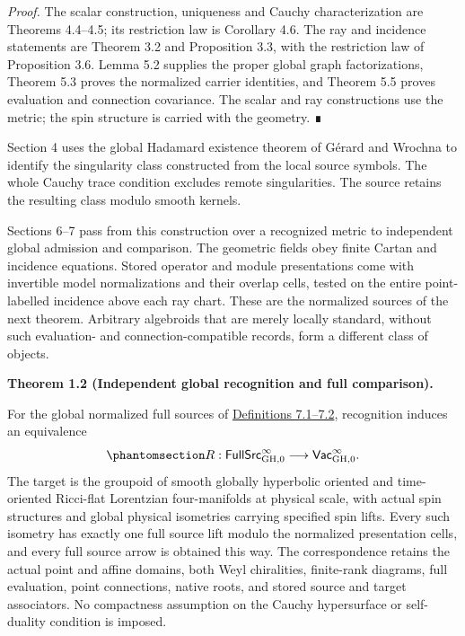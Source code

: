 \documentclass[
  english,
  11pt,
  reqno]{amsart}
\makeatletter
\newcommand{\pandocstatementheading}[1]{%
  \par\addpenalty{\@beginparpenalty}%
  \addvspace{.5\baselineskip plus .2\baselineskip minus .2\baselineskip}%
  {\normalfont\bfseries #1\par}%
  \nobreak\@afterindenttrue\@afterheading
}
\makeatother
\begin{document}
\emph{Proof.} The scalar construction, uniqueness and Cauchy
characterization are Theorems 4.4--4.5; its restriction law is Corollary
4.6. The ray and incidence statements are Theorem 3.2 and Proposition
3.3, with the restriction law of Proposition 3.6. Lemma 5.2 supplies the
proper global graph factorizations, Theorem 5.3 proves the normalized
carrier identities, and Theorem 5.5 proves evaluation and connection
covariance. The scalar and ray constructions use the metric; the spin
structure is carried with the geometry. ∎

Section 4 uses the global Hadamard existence theorem of Gérard and
Wrochna to identify the singularity class constructed from the local
source symbols. The whole Cauchy trace condition excludes remote
singularities. The source retains the resulting class modulo smooth
kernels.

Sections 6--7 pass from this construction over a recognized metric to
independent global admission and comparison. The geometric fields obey
finite Cartan and incidence equations. Stored operator and module
presentations come with invertible model normalizations and their
overlap cells, tested on the entire point-labelled incidence above each
ray chart. These are the normalized sources of the next theorem.
Arbitrary algebroids that are merely locally standard, without such
evaluation- and connection-compatible records, form a different class of
objects.

\pandocstatementheading{\protect{}\label{thm:global-normalized-correspondence-overview}Theorem 1.2 (Independent global recognition and full comparison).}

For the global normalized full sources of
\hyperref[def:global-independent-normalized-wave-packet]{Definitions
7.1--7.2}, recognition induces an equivalence
\begin{equation}\protect\phantomsection\label{eq:global-correspondence-overview}{
R:\mathsf{FullSrc}^{\infty}_{\mathrm{GH},0}
\longrightarrow\mathsf{Vac}^{\infty}_{\mathrm{GH},0}.
}\end{equation} The target is the groupoid of smooth globally hyperbolic
oriented and time-oriented Ricci-flat Lorentzian four-manifolds at
physical scale, with actual spin structures and global physical
isometries carrying specified spin lifts. Every such isometry has
exactly one full source lift modulo the normalized presentation cells,
and every full source arrow is obtained this way. The correspondence
retains the actual point and affine domains, both Weyl chiralities,
finite-rank diagrams, full evaluation, point connections, native roots,
and stored source and target associators. No compactness assumption on
the Cauchy hypersurface or self-duality condition is imposed.
\end{document}

